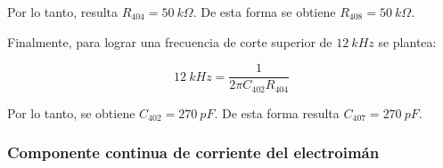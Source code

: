 Por lo tanto, resulta $R_{404}=50\:k\Omega$. De esta forma se obtiene $R_{408}=50\:k\Omega$.

Finalmente, para lograr una frecuencia de corte superior de $12\:kHz$ se plantea:

\begin{equation*} 
	12\:kHz=\frac{1}{2\pi C_{402}R_{404}}
\end{equation*}

Por lo tanto, se obtiene $C_{402}=270\:pF$. De esta forma resulta $C_{407}=270\:pF$.



%
%
%
%
%
%
%
%
%
%
%
%


\subsubsection{Componente continua de corriente del electroimán}

